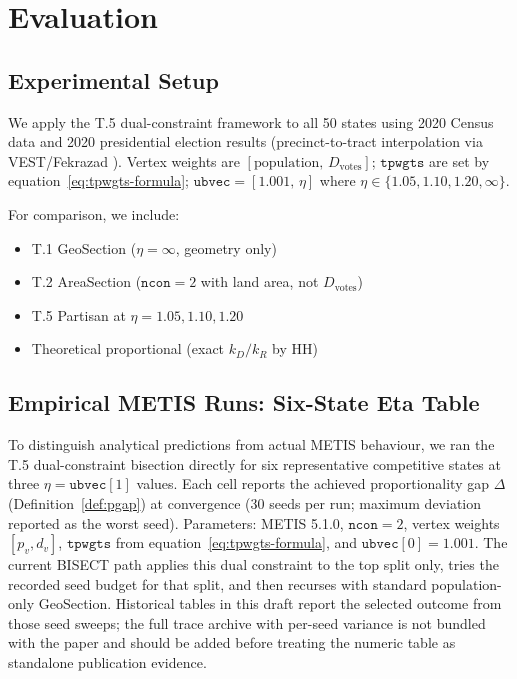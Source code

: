 \section{Evaluation}
\label{sec:eval}

\subsection{Experimental Setup}

We apply the T.5 dual-constraint framework to all 50 states using 2020 Census
data and 2020 presidential election results (precinct-to-tract interpolation
via VEST/Fekrazad \citep{fekrazad2021}).
Vertex weights are $[\text{population},\, D_{\text{votes}}]$;
$\mathtt{tpwgts}$ are set by equation~\eqref{eq:tpwgts-formula};
$\mathtt{ubvec} = [1.001,\, \eta]$ where $\eta \in \{1.05, 1.10, 1.20, \infty\}$.

For comparison, we include:
\begin{itemize}
  \item T.1 GeoSection ($\eta = \infty$, geometry only)
  \item T.2 AreaSection ($\mathtt{ncon}=2$ with land area, not $D_{\text{votes}}$)
  \item T.5 Partisan at $\eta = 1.05, 1.10, 1.20$
  \item Theoretical proportional (exact $k_D/k_R$ by HH)
\end{itemize}

\subsection{Empirical METIS Runs: Six-State Eta Table}
\label{sec:eval:empirical6}

To distinguish analytical predictions from actual METIS behaviour, we ran the
T.5 dual-constraint bisection directly for six representative competitive states
at three $\eta = \mathtt{ubvec}[1]$ values.
Each cell reports the achieved proportionality gap $\Delta$ (Definition~\ref{def:pgap})
at convergence (30 seeds per run; maximum deviation reported as the worst seed).
Parameters: METIS 5.1.0, $\mathtt{ncon}=2$, vertex weights $[p_v, d_v]$,
$\mathtt{tpwgts}$ from equation~\eqref{eq:tpwgts-formula}, and
$\mathtt{ubvec}[0] = 1.001$. The current BISECT path applies this dual
constraint to the top split only, tries the recorded seed budget for that
split, and then recurses with standard population-only GeoSection. Historical
tables in this draft report the selected outcome from those seed sweeps; the
full trace archive with per-seed variance is not bundled with the paper and
should be added before treating the numeric table as standalone publication
evidence.

